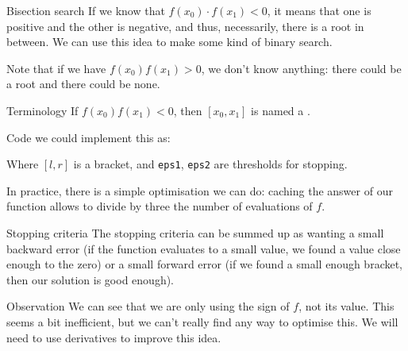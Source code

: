 \documentclass[a4paper]{article}
\begin{document}
\begin{parag}{Bisection search}
    If we know that $f\left(x_0\right)\cdot f\left(x_1\right) < 0$, it means that one is positive and the other is negative, and thus, necessarily, there is a root in between. We can use this idea to make some kind of binary search.

    Note that if we have $f\left(x_0\right) f\left(x_1\right) > 0$, we don't know anything: there could be a root and there could be none.

    \begin{subparag}{Terminology}
        If $f\left(x_0\right)f\left(x_1\right) < 0$, then $\left[x_0, x_1\right]$ is named a .
    \end{subparag}

    \begin{subparag}{Code}
        we could implement this as:
        
        Where $\left[l, r\right]$ is a bracket, and \texttt{eps1}, \texttt{eps2} are thresholds for stopping. 

        In practice, there is a simple optimisation we can do: caching the answer of our function allows to divide by three the number of evaluations of $f$.
    \end{subparag}

    \begin{subparag}{Stopping criteria}
       The stopping criteria can be summed up as wanting a small backward error (if  the function evaluates to a small value, we found a value close enough to the zero) or a small forward error (if we found a small enough bracket, then our solution is good enough).
       
    \end{subparag}

    \begin{subparag}{Observation}
       We can see that we are only using the sign of $f$, not its value. This seems a bit inefficient, but we can't really find any way to optimise this. We will need to use derivatives to improve this idea.
    \end{subparag}
\end{parag}
\end{document}
